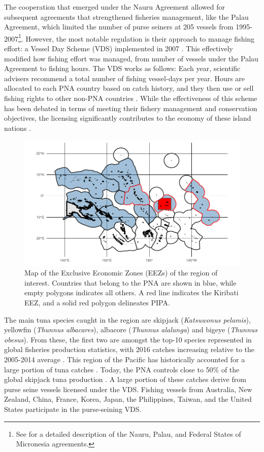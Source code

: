 \documentclass[11pt,english]{article}
\begin{document}
The cooperation that emerged under the Nauru Agreement allowed for subsequent
agreements that strengthened fisheries management, like the Palau
Agreement, which limited the number of purse seiners at 205 vessels from
1995-2007\footnote{See \citet{havice_2010} for a detailed description of
  the Nauru, Palau, and Federal States of Micronesia agreements.}. However, the most notable regulation is
their approach to manage fishing effort: a Vessel Day Scheme (VDS)
implemented in 2007 \citep{havice_2013}. This effectively modified how
fishing effort was managed, from number of vessels under the Palau
Agreement to fishing hours. The VDS works as follows: Each year,
scientific advisers recommend a total number of fishing vessel-days per
year. Hours are allocated to each PNA country based on catch history,
and they then use or sell fishing rights to other non-PNA countries
\citep{aqorau_2018}. While the effectiveness of this scheme has been
debated in terms of meeting their fishery management and conservation
objectives, the licensing significantly contributes to the economy of
these island nations \citep{havice_2010}.

\begin{figure}
\centering
\includegraphics{Manuscript_files/figure-latex/unnamed-chunk-3-1.pdf}
\caption{\label{fig:unnamed-chunk-3}\label{fig:PNA_map}Map of the Exclusive
Economic Zones (EEZs) of the region of interest. Countries that belong
to the PNA are shown in blue, while empty polygons indicates all others.
A red line indicates the Kiribati EEZ, and a solid red polygon
delineates PIPA.}
\end{figure}

The main tuna species caught in the region are skipjack
(\emph{Katsuwonus pelamis}), yellowfin (\emph{Thunnus albacares}),
albacore (\emph{Thunnus alalunga}) and bigeye (\emph{Thunnus obesus}).
From these, the first two are amongst the top-10 species represented in
global fisheries production statistics, with 2016 catches increasing
relative to the 2005-2014 average \citep{fao_2018}. This region of the
Pacific has historically accounted for a large portion of tuna catches
\citep{aqorau_1997}. Today, the PNA controls close to 50\% of the global
skipjack tuna production \citep{pna_website_2018}. A large portion of
these catches derive from purse seine vessels licensed under the VDS.
Fishing vessels from Australia, New Zealand, China, France, Korea,
Japan, the Philippines, Taiwan, and the United States participate in the
purse-seining VDS.
\end{document}
